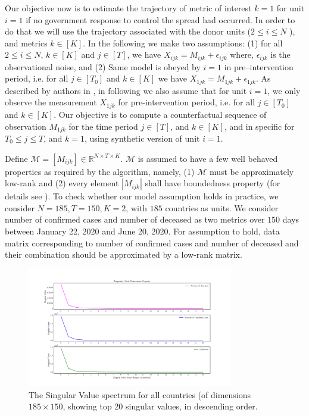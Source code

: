 \documentclass[fleqn,10pt]{wlscirep}
\begin{document}
	Our objective now is to estimate the trajectory of metric of interest $k = 1$  for unit $i = 1$ if no government response to control the spread had occurred. In order to do that we will use the trajectory associated with the donor units ($2 \leq i \leq N$ ), and metrics $k \in [K ]$. In the following we make two assumptions: (1) for all $2 \leq i \leq N$, $k \in [K]$ and $j \in [T]$, we have  $X_{ijk} = M_{ijk} + \epsilon_{ijk}$ where, $\epsilon_{ijk}$ is the observational noise, and (2) Same model is obeyed by $i=1$ in pre--intervention period, i.e. for all $j \in [T_0]$ and $k \in [K]$ we have $X_{1jk} = M_{1jk} + \epsilon_{1jk}$. As described by authors in \cite{AMSS19}, in following we also assume that for unit $i=1$, we only observe the measurement $X_{1jk}$ for pre-intervention period, i.e. for all $j \in [T_0]$ and $k \in [K]$. Our objective is to compute a counterfactual sequence of observation $M_{1jk}$ for the time period $j \in [T]$, and $k \in [K]$, and in specific for $T_0 \leq j \leq T$, and $k = 1$, using synthetic version of unit $i=1$.\par
	
	Define $\mathcal{M} = [M_{ijk}] \in \mathbb{R}^{N \times T \times K}$. $\mathcal{M}$ is assumed to have a few well behaved properties as required by the algorithm, namely, (1) $\mathcal{M} $ must be approximately low-rank and (2) every element $\left|M_{ijk}\right|$ shall have boundedness property (for details see \cite{AMSS19}). To check whether our model assumption holds in practice, we consider $N=185, T=150, K=2$, with $185$ countries as units. We consider number of confirmed cases and number of deceased as two metrics over $150$ days between January 22, 2020 and June 20, 2020. For assumption to hold, data matrix corresponding to number of confirmed cases and number of deceased and their combination should be approximated by a low-rank matrix. 
	
	\begin{figure}
		\centering
		\includegraphics[width=0.8\textwidth]{FIG1}
		\caption{The Singular Value spectrum for all countries (of dimensions $185 \times 150$, showing top 20 singular values, in descending order.} 
		\label{fig1} 
	\end{figure}
	
\end{document}
